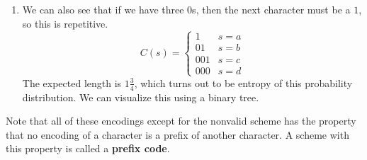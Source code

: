 \begin{example}
\begin{enumerate}
        \item We can also see that if we have three $0$s, then the next character must be a $1$, so this is repetitive. 
        \begin{equation}
          C (s) = \begin{cases} 1 & s = a \\ 01 & s = b \\ 001 & s = c \\ 000 & s = d \end{cases}
        \end{equation}
        The expected length is $1 \frac{3}{4}$, which turns out to be entropy of this probability distribution. We can visualize this using a binary tree. 
      \end{enumerate}
    \end{example}

    \begin{definition}
      \label{def:prefix-code}
      Note that all of these encodings except for the nonvalid scheme has the property that no encoding of a character is a prefix of another character. A scheme with this property is called a \textbf{prefix code}. 
    \end{definition}

